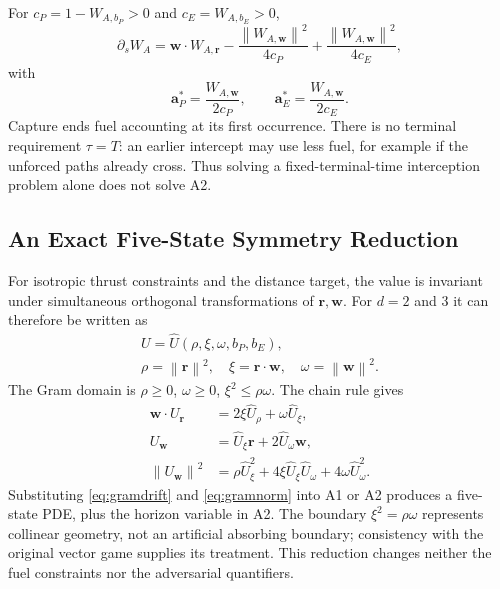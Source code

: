 \documentclass[journal,a4paper]{IEEEtran}
\newcommand{\norm}[1]{\left\|#1\right\|}
\begin{document}
For $c_P=1-W_{A,b_P}>0$ and $c_E=W_{A,b_E}>0$,
\begin{equation}
 \partial_s W_A=\mathbf w\cdot W_{A,\mathbf r}
  -\frac{\norm{W_{A,\mathbf w}}^2}{4c_P}
  +\frac{\norm{W_{A,\mathbf w}}^2}{4c_E},
 \label{eq:A2expanded}
\end{equation}
with
\begin{equation}
 \boxed{\mathbf a_P^*=\frac{W_{A,\mathbf w}}{2c_P},\qquad
        \mathbf a_E^*=\frac{W_{A,\mathbf w}}{2c_E}.}
 \label{eq:A2feedback}
\end{equation}
Capture ends fuel accounting at its first occurrence. There is no terminal requirement $\tau=T$: an earlier intercept may use less fuel, for example if the unforced paths already cross. Thus solving a fixed-terminal-time interception problem alone does not solve A2.

\subsection{An Exact Five-State Symmetry Reduction}
For isotropic thrust constraints and the distance target, the value is invariant under simultaneous orthogonal transformations of $\mathbf r,\mathbf w$. For $d=2$ and $3$ it can therefore be written as
\begin{equation}
\begin{gathered}
 U=\widehat U(\rho,\xi,\omega,b_P,b_E),\\
 \rho=\norm{\mathbf r}^2,\quad
 \xi=\mathbf r\cdot\mathbf w,\quad
 \omega=\norm{\mathbf w}^2.
\end{gathered}
 \label{eq:invariants}
\end{equation}
The Gram domain is $\rho\ge0$, $\omega\ge0$, $\xi^2\le\rho\omega$. The chain rule gives
\begin{align}
 \mathbf w\cdot U_{\mathbf r}
     &=2\xi\widehat U_\rho+\omega\widehat U_\xi,\label{eq:gramdrift}\\
 U_{\mathbf w}&=\widehat U_\xi\mathbf r+2\widehat U_\omega\mathbf w,\\
 \norm{U_{\mathbf w}}^2
     &=\rho\widehat U_\xi^2+4\xi\widehat U_\xi\widehat U_\omega
                                +4\omega\widehat U_\omega^2.
 \label{eq:gramnorm}
\end{align}
Substituting \eqref{eq:gramdrift} and \eqref{eq:gramnorm} into A1 or A2 produces a five-state PDE, plus the horizon variable in A2. The boundary $\xi^2=\rho\omega$ represents collinear geometry, not an artificial absorbing boundary; consistency with the original vector game supplies its treatment. This reduction changes neither the fuel constraints nor the adversarial quantifiers.
\end{document}
